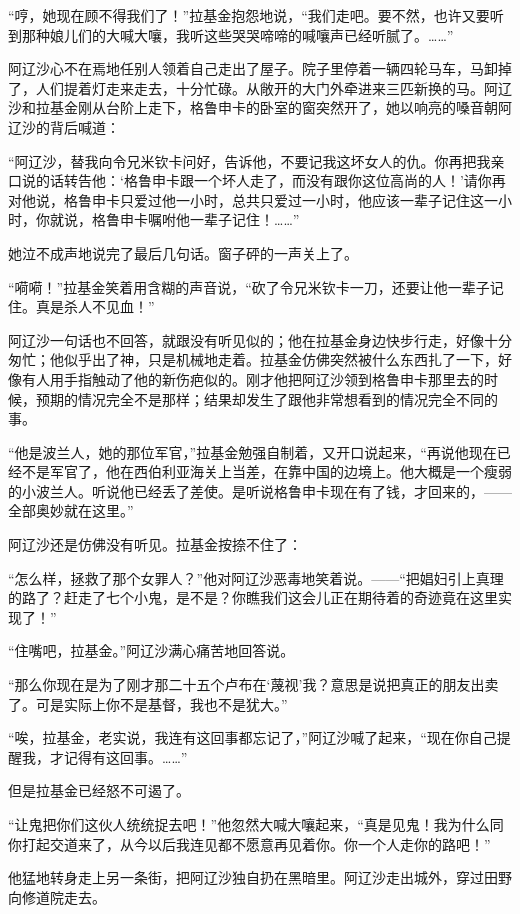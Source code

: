 \par “哼，她现在顾不得我们了！”拉基金抱怨地说，“我们走吧。要不然，也许又要听到那种娘儿们的大喊大嚷，我听这些哭哭啼啼的喊嚷声已经听腻了。……”
\par 阿辽沙心不在焉地任别人领着自己走出了屋子。院子里停着一辆四轮马车，马卸掉了，人们提着灯走来走去，十分忙碌。从敞开的大门外牵进来三匹新换的马。阿辽沙和拉基金刚从台阶上走下，格鲁申卡的卧室的窗突然开了，她以响亮的嗓音朝阿辽沙的背后喊道：
\par “阿辽沙，替我向令兄米钦卡问好，告诉他，不要记我这坏女人的仇。你再把我亲口说的话转告他：‘格鲁申卡跟一个坏人走了，而没有跟你这位高尚的人！’请你再对他说，格鲁申卡只爱过他一小时，总共只爱过一小时，他应该一辈子记住这一小时，你就说，格鲁申卡嘱咐他一辈子记住！……”
\par 她泣不成声地说完了最后几句话。窗子砰的一声关上了。
\par “嗬嗬！”拉基金笑着用含糊的声音说，“砍了令兄米钦卡一刀，还要让他一辈子记住。真是杀人不见血！”
\par 阿辽沙一句话也不回答，就跟没有听见似的；他在拉基金身边快步行走，好像十分匆忙；他似乎出了神，只是机械地走着。拉基金仿佛突然被什么东西扎了一下，好像有人用手指触动了他的新伤疤似的。刚才他把阿辽沙领到格鲁申卡那里去的时候，预期的情况完全不是那样；结果却发生了跟他非常想看到的情况完全不同的事。
\par “他是波兰人，她的那位军官，”拉基金勉强自制着，又开口说起来，“再说他现在已经不是军官了，他在西伯利亚海关上当差，在靠中国的边境上。他大概是一个瘦弱的小波兰人。听说他已经丢了差使。是听说格鲁申卡现在有了钱，才回来的，——全部奥妙就在这里。”
\par 阿辽沙还是仿佛没有听见。拉基金按捺不住了：
\par “怎么样，拯救了那个女罪人？”他对阿辽沙恶毒地笑着说。——“把娼妇引上真理的路了？赶走了七个小鬼，是不是？你瞧我们这会儿正在期待着的奇迹竟在这里实现了！”
\par “住嘴吧，拉基金。”阿辽沙满心痛苦地回答说。
\par “那么你现在是为了刚才那二十五个卢布在‘蔑视’我？意思是说把真正的朋友出卖了。可是实际上你不是基督，我也不是犹大。”
\par “唉，拉基金，老实说，我连有这回事都忘记了，”阿辽沙喊了起来，“现在你自己提醒我，才记得有这回事。……”
\par 但是拉基金已经怒不可遏了。
\par “让鬼把你们这伙人统统捉去吧！”他忽然大喊大嚷起来，“真是见鬼！我为什么同你打起交道来了，从今以后我连见都不愿意再见着你。你一个人走你的路吧！”
\par 他猛地转身走上另一条街，把阿辽沙独自扔在黑暗里。阿辽沙走出城外，穿过田野向修道院走去。

